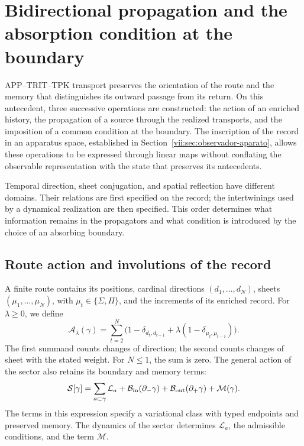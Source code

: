 
\section{Bidirectional propagation and the absorption condition at the boundary}
\label{vii:sec:propagacion-bidireccional}

APP--TRIT--TPK transport preserves the orientation of the route and the memory
that distinguishes its outward passage from its return. On this antecedent,
three successive operations are constructed: the action of an enriched history,
the propagation of a source through the realized transports, and the imposition
of a common condition at the boundary. The inscription of the record in an
apparatus space, established in Section~\ref{vii:sec:observador-aparato}, allows
these operations to be expressed through linear maps without conflating the
observable representation with the state that preserves its antecedents.

Temporal direction, sheet conjugation, and spatial reflection have different
domains. Their relations are first specified on the record; the intertwinings
used by a dynamical realization are then specified. This order determines what
information remains in the propagators and what condition is introduced by the
choice of an absorbing boundary.

\subsection{Route action and involutions of the record}
\label{vii:subsec:accion-bidireccional}

A finite route contains its positions, cardinal directions
\((d_1,\ldots,d_N)\), sheets \((\mu_1,\ldots,\mu_N)\), with
\(\mu_t\in\{\Sigma,\Pi\}\), and the increments of its enriched
record. For \(\lambda\geq0\), we define
\begin{equation}
 \mathcal A_\lambda(\gamma)
 =\sum_{t=2}^N
 \bigl(1-\delta_{d_t,d_{t-1}}
       +\lambda(1-\delta_{\mu_t,\mu_{t-1}})\bigr).
 \label{vii:eq:accion-ruta-bidireccional}
\end{equation}
The first summand counts changes of direction; the second counts changes of
sheet with the stated weight. For \(N\leq1\), the sum is zero.
The general action of the sector also retains its boundary and memory terms:
\begin{equation}
 \mathcal S[\gamma]
 =\sum_{a\subset\gamma}\mathcal L_a
  +\mathcal B_{\rm in}(\partial_-\gamma)
  +\mathcal B_{\rm out}(\partial_+\gamma)
  +\mathcal M(\gamma).
 \label{vii:eq:accion-enriquecida-frontera}
\end{equation}
The terms in this expression specify a variational class with typed endpoints
and preserved memory. The dynamics of the sector determines
\(\mathcal L_a\), the admissible conditions, and the term \(\mathcal M\).

